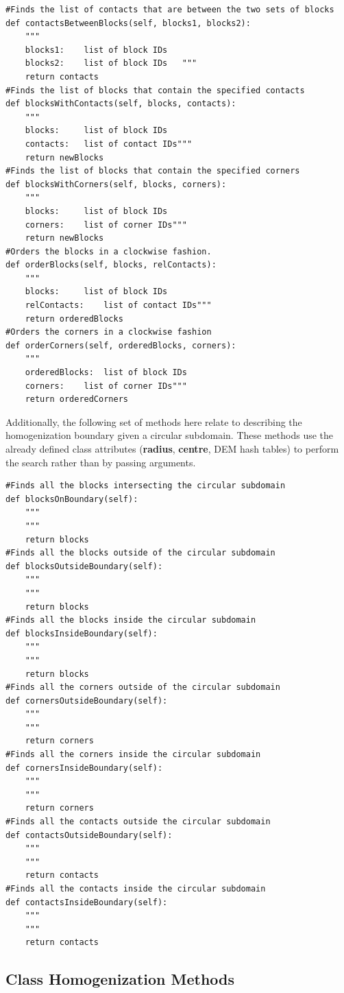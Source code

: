 \begin{lstlisting}[frame=single] 
#Finds the list of contacts that are between the two sets of blocks
def contactsBetweenBlocks(self, blocks1, blocks2):
	"""
	blocks1:	list of block IDs
	blocks2: 	list of block IDs	"""
	return contacts
#Finds the list of blocks that contain the specified contacts
def blocksWithContacts(self, blocks, contacts):
	"""
	blocks:		list of block IDs
	contacts:	list of contact IDs"""
	return newBlocks
#Finds the list of blocks that contain the specified corners
def blocksWithCorners(self, blocks, corners):
	"""
	blocks:		list of block IDs
	corners:	list of corner IDs"""
	return newBlocks
#Orders the blocks in a clockwise fashion.
def orderBlocks(self, blocks, relContacts):
	"""
	blocks:		list of block IDs
	relContacts:	list of contact IDs"""
	return orderedBlocks
#Orders the corners in a clockwise fashion
def orderCorners(self, orderedBlocks, corners):
	"""
	orderedBlocks:	list of block IDs
	corners:	list of corner IDs"""
	return orderedCorners
\end{lstlisting}
	
Additionally, the following set of methods here relate to describing the homogenization boundary given a circular subdomain. These methods use the already defined class attributes (\textbf{radius}, \textbf{centre}, DEM hash tables) to perform the search rather than by passing arguments.

\begin{lstlisting}[frame=single] 
#Finds all the blocks intersecting the circular subdomain
def blocksOnBoundary(self):
	"""
	"""
	return blocks
#Finds all the blocks outside of the circular subdomain
def blocksOutsideBoundary(self):
	"""
	"""
	return blocks
#Finds all the blocks inside the circular subdomain
def blocksInsideBoundary(self):
	"""
	"""
	return blocks
#Finds all the corners outside of the circular subdomain	
def cornersOutsideBoundary(self):
	"""
	"""
	return corners
#Finds all the corners inside the circular subdomain
def cornersInsideBoundary(self):
	"""
	"""
	return corners
#Finds all the contacts outside the circular subdomain
def contactsOutsideBoundary(self):
	"""
	"""
	return contacts
#Finds all the contacts inside the circular subdomain
def contactsInsideBoundary(self):
	"""
	"""
	return contacts
\end{lstlisting}

\subsection{Class Homogenization Methods}

